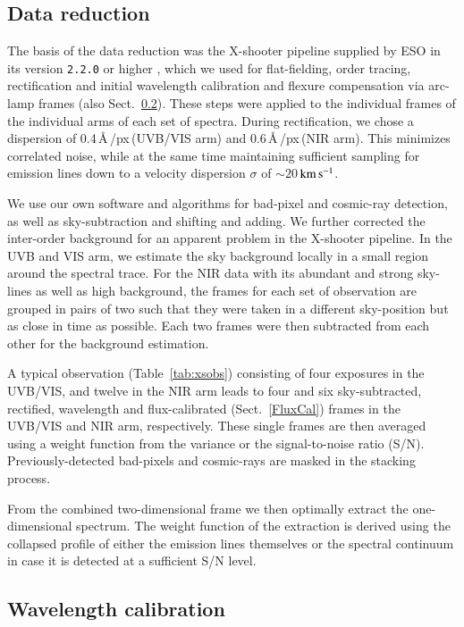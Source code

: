 \documentclass[traditabstract, longauth]{aa}
\newcommand{\kms}{$\rm{km\,s^{-1}}$}
\begin{document}
\subsection{Data reduction}

The basis of the data reduction was the X-shooter pipeline supplied by ESO in its version \texttt{2.2.0} or higher \citep{2006SPIE.6269E..80G, 2010SPIE.7737E..56M}, which we used for flat-fielding, order tracing, rectification and initial wavelength calibration and flexure compensation via arc-lamp frames (also Sect.~\ref{sec:wavecal}). These steps were applied to the individual frames of the individual arms of each set of spectra. During rectification, we chose a dispersion of 0.4\,\AA\,/px\,(UVB/VIS arm) and 0.6\,\AA\,/px\,(NIR arm). This minimizes correlated noise, while at the same time maintaining sufficient sampling for emission lines down to a velocity dispersion $\sigma$ of $\sim20\,$\kms. 

We use our own software and algorithms for bad-pixel and cosmic-ray detection, as well as sky-subtraction and shifting and adding. We further corrected the inter-order background for an apparent problem in the X-shooter pipeline. In the UVB and VIS arm, we estimate the sky background locally in a small region around the spectral trace. For the NIR data with its abundant and strong sky-lines as well as high background, the frames for each set of observation are grouped in pairs of two such that they were taken in a different sky-position but as close in time as possible. Each two frames were then subtracted from each other for the background estimation.

A typical observation (Table~\ref{tab:xsobs}) consisting of four exposures in the UVB/VIS, and twelve in the NIR arm leads to four and six sky-subtracted, rectified, wavelength and flux-calibrated (Sect.~\ref{FluxCal}) frames in the UVB/VIS and NIR arm, respectively. These single frames are then averaged using a weight function from the variance or the signal-to-noise ratio (S/N). Previously-detected bad-pixels and cosmic-rays are masked in the stacking process.

From the combined two-dimensional frame we then optimally extract the one-dimensional spectrum. The weight function of the extraction is derived using the collapsed profile of either the emission lines themselves or the spectral continuum in case it is detected at a sufficient S/N level.

\subsection{Wavelength calibration}
\label{sec:wavecal}
\end{document}
